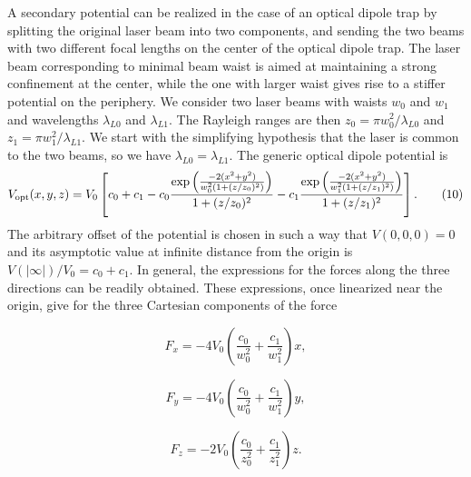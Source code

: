 \documentclass[pra,letterpaper,onecolumn,superscriptaddress,floatfix]{revtex4}
\begin{document}
A secondary potential can be realized in the case of an optical dipole trap by splitting the original laser 
beam into two components, and sending the two beams with two different focal lengths on the center of the 
optical dipole trap. The laser beam corresponding to minimal beam waist is aimed at maintaining a strong 
confinement at the center, while the one with larger waist gives rise to a stiffer potential on the periphery. 
We consider two laser beams with waists $w_{0}$ and $w_{1}$ and wavelengths 
$\lambda_{L0}$ and $\lambda_{L1}$. The Rayleigh ranges are then $z_{0}=\pi w_{0}^2/\lambda_{L0}$ and 
$z_{1}=\pi w_{1}^2/\lambda_{L1}$. We start with the simplifying hypothesis that the laser is common 
to the two beams, so we have $\lambda_{L0}=\lambda_{L1}$. The generic optical dipole potential is
\begin{equation}
V_{\rm opt}(x,y,z)=V_0
\left[
c_0 + c_1 -
c_0 \frac{\exp\left(\frac{-2(x^2+y^2)}{w_{0}^2(1+(z/z_{0})^2)}\right)}{1+(z/z_{0})^2}-
c_1  \frac{\exp\left(\frac{-2(x^2+y^2)}{w_{1}^2(1+(z/z_{1})^2)}\right)}{1+(z/z_{1})^2}
\right].
\tag{10}
\end{equation}
The arbitrary offset of the potential is chosen in such a way that $V(0,0,0)=0$ and
its asymptotic value at infinite distance from the origin is  $V(|\infty|)/V_0=c_0+c_1$.
In general, the expressions for the forces along the three directions can be readily obtained. 
These expressions, once linearized near the origin, give for the three Cartesian components of the force

\begin{equation}
F_x=-4V_0  \left(\frac{c_0}{w_0^2}+\frac{c_1}{w_1^2} \right)x,
\tag{11a}
\end{equation}

\begin{equation}
F_y=-4V_0  \left(\frac{c_0}{w_0^2}+\frac{c_1}{w_1^2} \right)y,
\tag{11b}
\end{equation}

\begin{equation}
F_z=-2 V_0 \left(\frac{c_0}{z_0^2}+\frac{c_1}{z_1^2} \right)z.
\tag{11c}
\end{equation}
\end{document}
